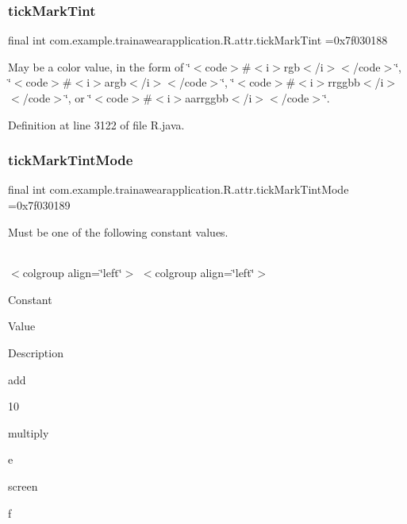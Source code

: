 \subsubsection{\texorpdfstring{tickMarkTint}{tickMarkTint}}
{\footnotesize\ttfamily final int com.\+example.\+trainawearapplication.\+R.\+attr.\+tick\+Mark\+Tint =0x7f030188\hspace{0.3cm}{\ttfamily [static]}}

May be a color value, in the form of \char`\"{}$<$code$>$\#$<$i$>$rgb$<$/i$>$$<$/code$>$\char`\"{}, \char`\"{}$<$code$>$\#$<$i$>$argb$<$/i$>$$<$/code$>$\char`\"{}, \char`\"{}$<$code$>$\#$<$i$>$rrggbb$<$/i$>$$<$/code$>$\char`\"{}, or \char`\"{}$<$code$>$\#$<$i$>$aarrggbb$<$/i$>$$<$/code$>$\char`\"{}. 

Definition at line 3122 of file R.\+java.

\mbox{\label{classcom_1_1example_1_1trainawearapplication_1_1_r_1_1attr_a92d10ebf841217cf1f1e18424edc5f8c}} 
\subsubsection{\texorpdfstring{tickMarkTintMode}{tickMarkTintMode}}
{\footnotesize\ttfamily final int com.\+example.\+trainawearapplication.\+R.\+attr.\+tick\+Mark\+Tint\+Mode =0x7f030189\hspace{0.3cm}{\ttfamily [static]}}

Must be one of the following constant values.

\tabulinesep=1mm
\begin{longtabu}spread 0pt [c]{*{0}{|X[-1]}|}
\hline
\end{longtabu}
$<$colgroup align=\char`\"{}left\char`\"{}$>$ $<$colgroup align=\char`\"{}left\char`\"{}$>$ 

Constant

Value

Description 

add

10

multiply

e

screen

f

